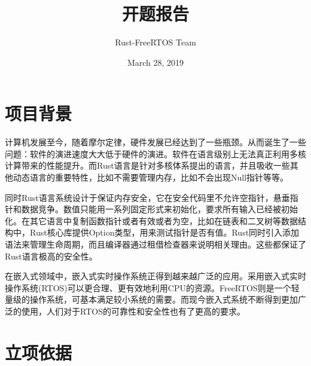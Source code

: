 \documentclass[12pt, a4paper]{article}
\title{开题报告}
\author{Rust-FreeRTOS Team}
\date{March 28, 2019}
\begin{document}
	\maketitle
	\clearpage
	\tableofcontents
	\clearpage
	\section{项目背景}
	计算机发展至今，随着摩尔定律，硬件发展已经达到了一些瓶颈。从而诞生了一些问题：软件的演进速度大大低于硬件的演进。软件在语言级别上无法真正利用多核计算带来的性能提升。而Rust语言是针对多核体系提出的语言，并且吸收一些其他动态语言的重要特性，比如不需要管理内存，比如不会出现Null指针等等。
	
	同时Rust语言系统设计于保证内存安全，它在安全代码里不允许空指针，悬垂指针和数据竞争。数值只能用一系列固定形式来初始化，要求所有输入已经被初始化。在其它语言中复制函数指针或者有效或者为空，比如在链表和二叉树等数据结构中，Rust核心库提供Option类型，用来测试指针是否有值。Rust同时引入添加语法来管理生命周期，而且编译器通过租借检查器来说明相关理由。这些都保证了Rust语言极高的安全性。
	
	在嵌入式领域中，嵌入式实时操作系统正得到越来越广泛的应用。采用嵌入式实时操作系统(RTOS)可以更合理、更有效地利用CPU的资源。FreeRTOS则是一个轻量级的操作系统，可基本满足较小系统的需要。而现今嵌入式系统不断得到更加广泛的使用，人们对于RTOS的可靠性和安全性也有了更高的要求。
	\section{立项依据}
\end{document}
